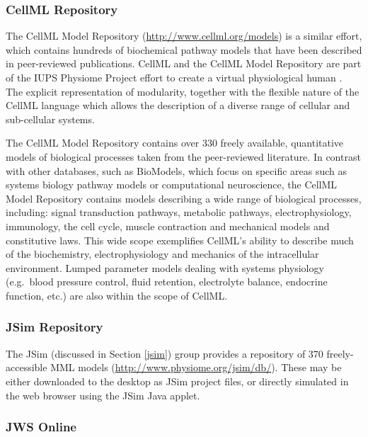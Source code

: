 \subsubsection{CellML Repository}

The CellML Model Repository (\url{http://www.cellml.org/models})
\autocite{lloyd2008cellml} \autocite{beard2009cellml} is a similar
effort, which contains hundreds of biochemical pathway models that have
been described in peer-reviewed publications. CellML and the CellML
Model Repository are part of the IUPS Physiome Project effort to create
a virtual physiological human \autocite{hunter2005integration}. The
explicit representation of modularity, together with the flexible nature
of the CellML language which allows the description of a diverse range
of cellular and sub-cellular systems.

The CellML Model Repository contains over 330 freely available,
quantitative models of biological processes taken from the peer-reviewed
literature. In contrast with other databases, such as BioModels, which
focus on specific areas such as systems biology pathway models or
computational neuroscience, the CellML Model Repository contains models
describing a wide range of biological processes, including: signal
transduction pathways, metabolic pathways, electrophysiology,
immunology, the cell cycle, muscle contraction and mechanical models and
constitutive laws. This wide scope exemplifies CellML's ability to
describe much of the biochemistry, electrophysiology and mechanics of
the intracellular environment. Lumped parameter models dealing with
systems physiology (e.g.~blood pressure control, fluid retention,
electrolyte balance, endocrine function, etc.) are also within the scope
of CellML.

\subsubsection{JSim Repository}

The JSim (discussed in Section \ref{jsim}) group provides a repository
of 370 freely-accessible MML models
(\url{http://www.physiome.org/jsim/db/}). These may be either downloaded
to the desktop as JSim project files, or directly simulated in the web
browser using the JSim Java applet.

\subsubsection{JWS Online}


